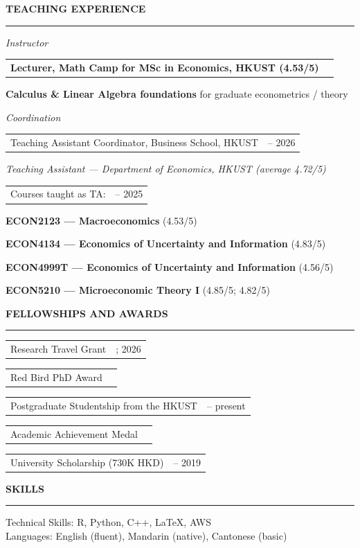 \documentclass[11pt,letterpaper]{article}
\makeatletter
\newlength{\cvdatecol}
\newcommand{\sectionheader}[1]{%
  \vspace{0.5em}
  {\large\bfseries #1}\\[-0.15em]
  \rule{\textwidth}{0.4pt}\par
  \vspace{0.22em}
}
\newcommand{\cvline}[3][0em]{%
  \par\nobreak
  \noindent\hspace*{#1}%
  \begin{tabularx}{\dimexpr\textwidth-#1\relax}{@{}X@{\hspace{0.75em}}>{\raggedleft\arraybackslash}p{\cvdatecol}@{}}
  #2 & #3 \\
  \end{tabularx}%
}
\newcommand{\courseline}[1]{%
  \par\addvspace{0.26em}%
  \noindent\hspace*{3.2em}#1\par
}
\makeatother
\begin{document}
\sectionheader{TEACHING EXPERIENCE}
{
\textit{Instructor}\\[-0.45em]
\cvline[1.5em]{\textbf{Lecturer, Math Camp for MSc in Economics, HKUST (4.53/5)}}{2026}
\vspace{0.05em}
\courseline{\textbf{Calculus \& Linear Algebra foundations} for graduate econometrics / theory}
\vspace{0.15em}
\textit{Coordination}\\[-0.45em]
\cvline[1.5em]{Teaching Assistant Coordinator, Business School, HKUST}{2025 -- 2026}
\vspace{0.1em}
\textit{Teaching Assistant --- Department of Economics, HKUST (average 4.72/5)}\\[-0.35em]
\cvline[1.5em]{Courses taught as TA:}{2020 -- 2025}
\vspace{0.08em}
\courseline{\textbf{ECON2123 --- Macroeconomics} (4.53/5)}
\courseline{\textbf{ECON4134 --- Economics of Uncertainty and Information} (4.83/5)}
\courseline{\textbf{ECON4999T --- Economics of Uncertainty and Information} (4.56/5)}
\courseline{\textbf{ECON5210 --- Microeconomic Theory I} (4.85/5; 4.82/5)}
}

\sectionheader{FELLOWSHIPS AND AWARDS}
{
\cvline[1.5em]{Research Travel Grant}{2023; 2026}
\vspace{-0.12em}
\cvline[1.5em]{Red Bird PhD Award}{2022}
\vspace{-0.12em}
\cvline[1.5em]{Postgraduate Studentship from the HKUST}{2020 -- present}
\vspace{-0.12em}
\cvline[1.5em]{Academic Achievement Medal}{2019}
\vspace{-0.12em}
\cvline[1.5em]{University Scholarship (730K HKD)}{2015 -- 2019}
}

\sectionheader{SKILLS}
Technical Skills: R, Python, C++, \LaTeX, AWS\\
Languages: English (fluent), Mandarin (native), Cantonese (basic)
\end{document}

